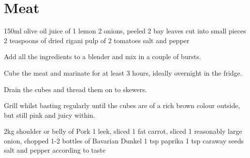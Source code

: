 \chapter{Meat}
\minitoc 


\begin{ingreds}
	150ml olive oil
	juice of 1 lemon
	2 onions, peeled
	2 bay leaves cut into small pieces
	2 teaspoons of dried rigani
	pulp of 2 tomatoes
	salt and pepper
\end{ingreds}

\begin{method}
     	Add all the ingredients to a blender and mix in a couple of bursts.

	Cube the meat and marinate for at least 3 hours, ideally overnight in the fridge.

	Drain the cubes and thread them on to skewers.

	Grill whilst basting regularly until the cubes are of a rich brown colour outside, but still pink and juicy within.
\end {method}


\begin{ingreds}
	2kg shoulder or belly of Pork 
	1 leek, sliced
	1 fat carrot, sliced
	1 reasonably large onion, chopped
	1-2 bottles of Bavarian Dunkel
	1 tsp paprika
	1 tsp caraway seeds
	salt and pepper according to taste	
\end{ingreds}

